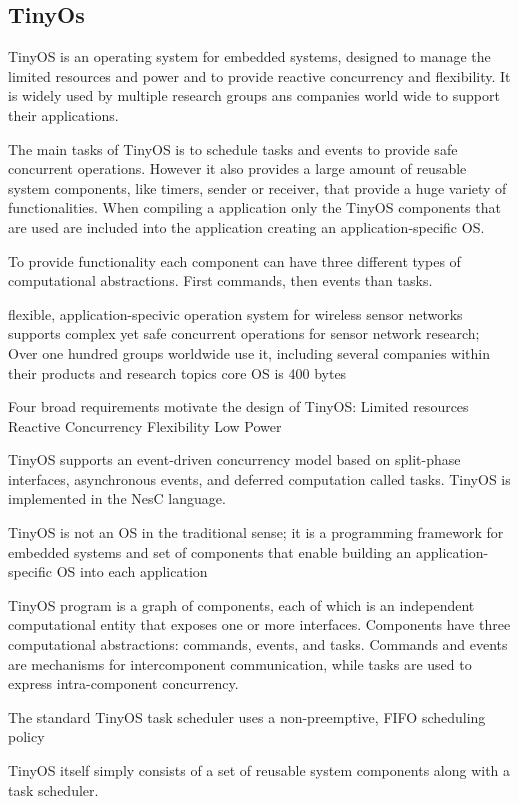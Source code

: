 \subsection{TinyOs}
TinyOS is an operating system for embedded systems, designed to manage the limited resources and power and to provide reactive concurrency and flexibility. It is widely used by multiple research groups ans companies world wide to support their applications.

The main tasks of TinyOS is to schedule tasks and events to provide safe concurrent operations. However it also provides a large amount of reusable system components, like timers, sender or receiver, that provide a huge variety of functionalities. When compiling a application only the TinyOS components that are used are included into the application creating an application-specific OS.

To provide functionality each component can have three different types of computational abstractions. First commands, then events than tasks.

flexible, application-specivic operation system for wireless sensor networks
supports complex yet safe concurrent operations
for sensor network research;
Over one hundred groups worldwide use it, including several companies within their products
and research topics
core OS is 400 bytes

Four broad requirements motivate the design of TinyOS:
Limited resources
Reactive Concurrency
Flexibility
Low Power

TinyOS supports an event-driven concurrency model based on split-phase interfaces, asynchronous events, and deferred computation called tasks. TinyOS is implemented in the NesC language.

TinyOS is not an OS in the traditional sense; it is a programming framework for embedded systems and set of components that enable building an application-specific OS into each application

TinyOS program is a graph of components, each of which is an independent computational entity that exposes one or more interfaces. Components have three computational abstractions: commands, events, and tasks. Commands and events are mechanisms for intercomponent communication, while tasks are used to express intra-component concurrency.

The standard TinyOS task scheduler uses a non-preemptive, FIFO scheduling policy

TinyOS itself simply consists of a set of reusable system components along with a task scheduler.
